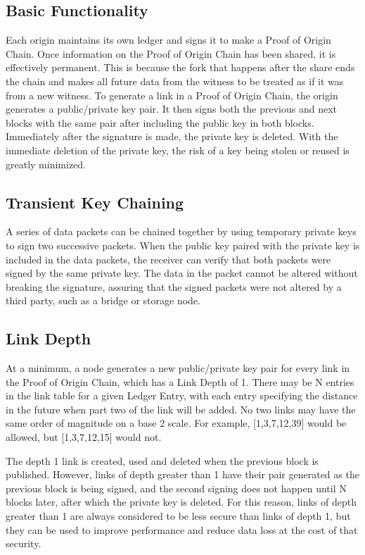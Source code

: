\documentclass{article}
\begin{document}
\subsection {Basic Functionality}
Each origin maintains its own ledger and signs it to make a Proof of Origin Chain. Once information on the Proof of Origin Chain has been shared, it is effectively permanent. This is because the fork that happens after the share ends the chain and makes all future data from the witness to be treated as if it was from a new witness. To generate a link in a Proof of Origin Chain, the origin generates a public/private key pair. It then signs both the previous and next blocks with the same pair after including the public key in both blocks. Immediately after the signature is made, the private key is deleted. With the immediate deletion of the private key, the risk of a key being stolen or reused is greatly minimized.

\subsection {Transient Key Chaining}
A series of data packets can be chained together by using temporary private keys to sign two successive packets. When the public key paired with the private key is included in the data packets, the receiver can verify that both packets were signed by the same private key. The data in the packet cannot be altered without breaking the signature, assuring that the signed packets were not altered by a third party, such as a \gls{bridge} or storage node.

\subsection {Link Depth}
At a minimum, a node generates a new public/private key pair for every link in the Proof of Origin Chain, which has a Link Depth of 1. There may be N entries in the link table for a given Ledger Entry, with each entry specifying the distance in the future when part two of the link will be added. No two links may have the same order of magnitude on a base 2 scale. For example, [1,3,7,12,39] would be allowed, but [1,3,7,12,15] would not.

The depth 1 link is created, used and deleted when the previous block is published. However, links of depth greater than 1 have their pair generated as the previous block is being signed, and the second signing does not happen until N blocks later, after which the private key is deleted. For this reason, links of depth greater than 1 are always considered to be less secure than links of depth 1, but they can be used to improve performance and reduce data loss at the cost of that security.
\end{document}
